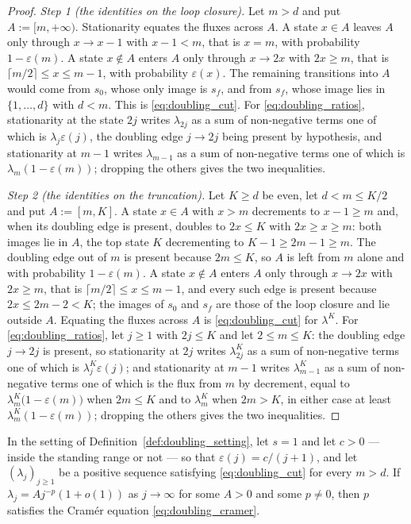 \begin{proof}
\emph{Step 1 (the identities on the loop closure).} Let $m>d$ and put $A:=[m,+\infty)$.
Stationarity equates the fluxes across $A$.
A state $x\in A$ leaves $A$ only through $x\rightarrow x-1$ with $x-1<m$, that is $x=m$,
with probability $1-\varepsilon(m)$. A state $x\notin A$ enters $A$ only through
$x\rightarrow2x$ with $2x\geq m$, that is $\lceil m/2\rceil\leq x\leq m-1$, with probability
$\varepsilon(x)$. The remaining
transitions into $A$ would come from $s_0$, whose only image is $s_f$, and from $s_f$, whose
image lies in $\{1,\dots,d\}$ with $d<m$. This is \eqref{eq:doubling_cut}. For
\eqref{eq:doubling_ratios}, stationarity at the state $2j$ writes $\lambda_{2j}$ as a sum of
non-negative terms one of which is $\lambda_j\varepsilon(j)$, the doubling edge $j\rightarrow2j$
being present by hypothesis, and stationarity at $m-1$ writes $\lambda_{m-1}$ as a sum of
non-negative terms one of which is $\lambda_m(1-\varepsilon(m))$; dropping the others gives
the two inequalities.

\emph{Step 2 (the identities on the truncation).} Let $K\geq d$ be even, let $d<m\leq K/2$ and
put $A:=[m,K]$. A state $x\in A$ with $x>m$ decrements to $x-1\geq m$ and, when its doubling
edge is present, doubles to $2x\leq K$ with $2x\geq x\geq m$: both images lie in $A$, the top
state $K$ decrementing to $K-1\geq2m-1\geq m$. The doubling edge out of $m$ is present because
$2m\leq K$, so $A$ is left from $m$ alone and with probability $1-\varepsilon(m)$. A state
$x\notin A$ enters $A$ only through $x\rightarrow2x$ with $2x\geq m$, that is
$\lceil m/2\rceil\leq x\leq m-1$, and every such edge is present because $2x\leq2m-2<K$; the
images of $s_0$ and $s_f$ are those of the loop closure and lie outside $A$. Equating the
fluxes across $A$ is \eqref{eq:doubling_cut} for $\lambda^K$. For \eqref{eq:doubling_ratios},
let $j\geq1$ with $2j\leq K$ and let $2\leq m\leq K$: the doubling edge $j\rightarrow2j$ is
present, so stationarity at $2j$ writes $\lambda^K_{2j}$ as a sum of non-negative terms one of
which is $\lambda^K_j\varepsilon(j)$; and stationarity at $m-1$ writes $\lambda^K_{m-1}$ as a
sum of non-negative terms one of which is the flux from $m$ by decrement, equal to
$\lambda^K_m\bigl(1-\varepsilon(m)\bigr)$ when $2m\leq K$ and to $\lambda^K_m$ when $2m>K$, in
either case at least $\lambda^K_m(1-\varepsilon(m))$; dropping the others gives the two
inequalities.
\end{proof}

\begin{proposition}\label{prop:doubling_exponent}
In the setting of Definition~\ref{def:doubling_setting}, let $s=1$ and let $c>0$ --- inside the
standing range or not --- so that $\varepsilon(j)=c/(j+1)$, and let $(\lambda_j)_{j\geq1}$ be a
positive sequence satisfying \eqref{eq:doubling_cut} for every $m>d$. If $\lambda_j=Aj^{-p}(1+o(1))$ as
$j\rightarrow\infty$ for some $A>0$ and some $p\neq0$, then $p$ satisfies the Cram\'er
equation \eqref{eq:doubling_cramer}.
\end{proposition}


